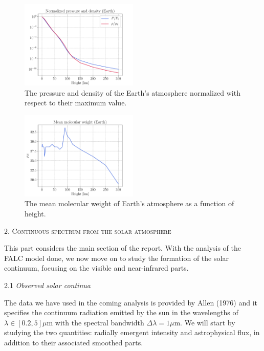 \documentclass[a4paper,11.5pt,]{article}
\begin{document}
\begin{multicols}{2}
\begin{figure}[H]
    \centering
    \includegraphics[width = 0.5\textwidth]{figures/1.3/Earth_Normalized_den_pres.pdf}
    \caption{The pressure and density of the Earth's atmosphere normalized with respect to their maximum value.} 
    \label{fig: norm dens press}
\end{figure}

\begin{figure}[H]
    \centering
    \includegraphics[width = 0.5\textwidth]{figures/1.3/Earth_mu.pdf}
    \caption{The mean molecular weight of Earth's atmosphere as a function of height.}
    \label{fig: mu}
\end{figure}

\begin{center}
2. \textsc{Continuous spectrum from the solar atmosphere}
\end{center}

This part considers the main section of the report. With the analysis of the FALC model done, we now move on to study the formation of the solar continuum, focusing on the visible and near-infrared parts. 

\begin{center}
2.1 \textit{Observed solar continua}
\end{center}

The data we have used in the coming analysis is provided by Allen (1976) and it specifies the continuum radiation emitted by the sun in the wavelengths of $\lambda \in [0.2,5]\mu$m with the spectral bandwidth $\Delta \lambda = 1 \mu$m. We will start by studying the two quantities: radially emergent intensity and astrophysical flux, in addition to their associated smoothed parts. 


\end{multicols}
\end{document}
